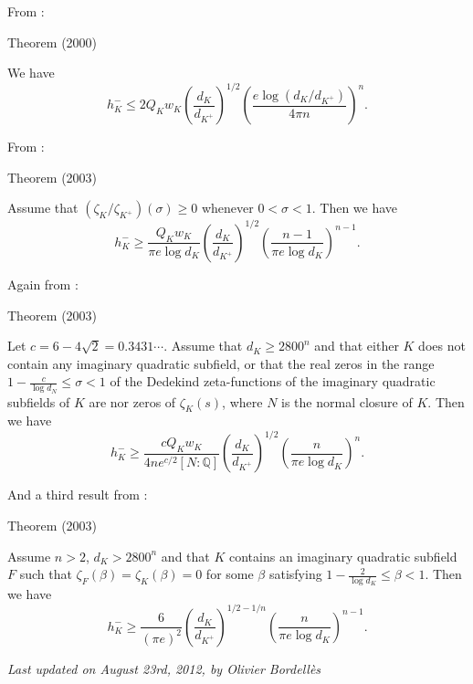 From \cite{Louboutin*00}:
\begin{thm}{Theorem (2000)}

  We have
  $$
  h^-_K
  \le
  2Q_Kw_K\left(\frac{d_K}{d_{K^+}}\right)^{1/2}
  \left(
  \frac{e\log(d_K/d_{K^+})}{4\pi n}
  \right)^n.
  $$
\end{thm}


From \cite{Louboutin*03}:
\begin{thm}{Theorem (2003)}

  Assume that $(\zeta_K/\zeta_{K^+})(\sigma)\ge0$ whenever $0 < \sigma <
  1$. Then we have
  $$
  h^-_K
  \ge
  \frac{Q_Kw_K}{\pi e \log d_K}
  \left(\frac{d_K}{d_{K^+}}\right)^{1/2}
  \left(
  \frac{n-1}{\pi e\log d_K}
  \right)^{n-1}.
  $$
\end{thm}


Again from \cite{Louboutin*03}:
\begin{thm}{Theorem (2003)}

  Let $c=6-4\sqrt{2}=0.3431\cdots$. Assume that $d_K\ge 2800^n$ and that
  either $K$ does not contain any imaginary quadratic subfield, or that the
  real zeros in the range $1-\frac{c}{\log d_N}\le \sigma < 1$ of the Dedekind
  zeta-functions of the imaginary quadratic subfields of $K$ are nor zeros of
  $\zeta_K(s)$, where $N$ is the normal closure of $K$. Then we have
  $$
  h^-_K
  \ge
  \frac{cQ_Kw_K}{4ne^{c/2}[N:\mathbb{Q}]}
  \left(\frac{d_K}{d_{K^+}}\right)^{1/2}
  \left(
  \frac{n}{\pi e\log d_K}
  \right)^{n}.
  $$
\end{thm}


And a third result from \cite{Louboutin*03}:
\begin{thm}{Theorem (2003)}

  Assume $n > 2$, $d_K > 2800^n$ and that
  $K$ contains an imaginary quadratic subfield $F$ such that
  $\zeta_F(\beta)=\zeta_K(\beta)=0$ for some $\beta$ satisfying
  $1-\frac{2}{\log d_K}\le \beta < 1$.
  Then we have
  $$
  h^-_K
  \ge
  \frac{6}{(\pi e)^2}
  \left(\frac{d_K}{d_{K^+}}\right)^{1/2-1/n}
  \left(
  \frac{n}{\pi e\log d_K}
  \right)^{n-1}.
  $$
\end{thm}






 
 







  
\begin{flushright}\small\sl{}   Last updated on August 23rd, 2012, by Olivier Bordell\`es
 \end{flushright}














